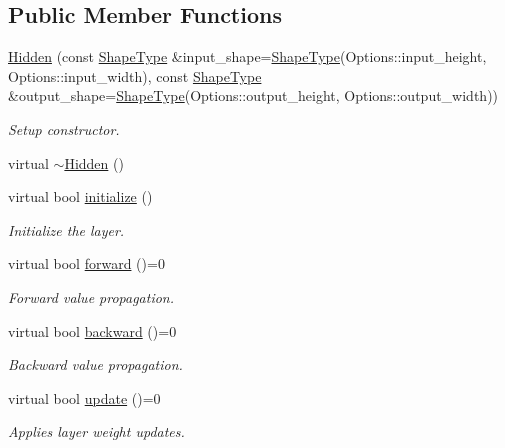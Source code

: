 \subsection*{Public Member Functions}
\begin{DoxyCompactItemize}
\item 
\hyperlink{classffnn_1_1layer_1_1_hidden_ae87f0ac803b0f889823deeb80c3124c5}{Hidden} (const \hyperlink{classffnn_1_1layer_1_1_hidden_a567e902299b3355501393cf6c7b27c38}{Shape\-Type} \&input\-\_\-shape=\hyperlink{classffnn_1_1layer_1_1_hidden_a567e902299b3355501393cf6c7b27c38}{Shape\-Type}(Options\-::input\-\_\-height, Options\-::input\-\_\-width), const \hyperlink{classffnn_1_1layer_1_1_hidden_a567e902299b3355501393cf6c7b27c38}{Shape\-Type} \&output\-\_\-shape=\hyperlink{classffnn_1_1layer_1_1_hidden_a567e902299b3355501393cf6c7b27c38}{Shape\-Type}(Options\-::output\-\_\-height, Options\-::output\-\_\-width))
\begin{DoxyCompactList}\small\item\em Setup constructor. \end{DoxyCompactList}\item 
virtual \hyperlink{classffnn_1_1layer_1_1_hidden_aa4453b6032e969b3cc31eb7f083d2359}{$\sim$\-Hidden} ()
\item 
virtual bool \hyperlink{classffnn_1_1layer_1_1_hidden_a50b9141e7d96fb7c6a1a6418fb204d92}{initialize} ()
\begin{DoxyCompactList}\small\item\em Initialize the layer. \end{DoxyCompactList}\item 
virtual bool \hyperlink{classffnn_1_1layer_1_1_hidden_aba6a84a760d66acec2e6e67c29a67f5b}{forward} ()=0
\begin{DoxyCompactList}\small\item\em Forward value propagation. \end{DoxyCompactList}\item 
virtual bool \hyperlink{classffnn_1_1layer_1_1_hidden_ac26b0c21f2d47b06b6ecba0211bb696e}{backward} ()=0
\begin{DoxyCompactList}\small\item\em Backward value propagation. \end{DoxyCompactList}\item 
virtual bool \hyperlink{classffnn_1_1layer_1_1_hidden_ac95dceacf1a0ea65674fb269a48730fb}{update} ()=0
\begin{DoxyCompactList}\small\item\em Applies layer weight updates. \end{DoxyCompactList}\end{DoxyCompactItemize}
